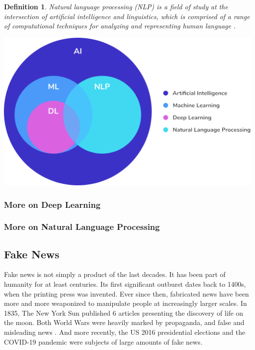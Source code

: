 \documentclass[12pt, a4paper]{article}
\newtheorem{definition}{Definition}
\begin{document}
  \begin{definition}
    Natural language processing (NLP) is a field of study at the intersection of artificial intelligence and linguistics, which is comprised of a range of computational techniques for analyzing and representing human language \cite{a8}.
  \end{definition}

  \includegraphics[width=\textwidth,height=\textheight,keepaspectratio]{images/ai-dl-ml-nlp-diagram.png}

  \subsubsection{More on Deep Learning}
  \subsubsection{More on Natural Language Processing}

  \subsection{Fake News}
  Fake news is not simply a product of the last decades. It has been part of humanity for at least centuries. Its first significant outburst dates back to 1400s, when the printing press was invented. Ever since then, fabricated news have been more and more weaponized to manipulate people at increasingly larger scales. In 1835, The New York Sun published 6 articles presenting the discovery of life on the moon. Both World Wars were heavily marked by propaganda, and false and misleading news \cite{a4}. And more recently, the US 2016 presidential elections and the COVID-19 pandemic were subjects of large amounts of fake news.
\end{document}
